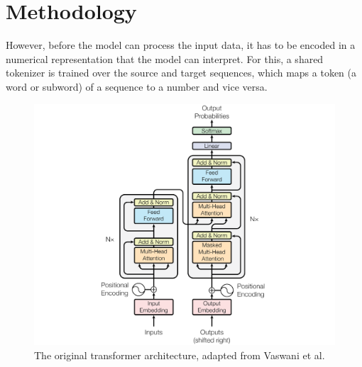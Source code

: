\section{Methodology} 
However, before the model can process the input data, it has to be encoded in a numerical representation that the model can interpret.
For this, a shared tokenizer is trained over the source and target sequences, which maps a token (a word or subword) of a sequence to a number and vice versa. 


\begin{figure}[h]
    \begin{center}
        \includegraphics[width=\textwidth]{figures/transformer.png}
    \end{center}
    \caption{The original transformer architecture, adapted from Vaswani et al.~\cite{vaswani2017attention}}\label{fig:transformer}
\end{figure}

